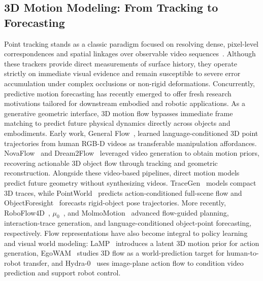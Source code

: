 \subsection{3D Motion Modeling: From Tracking to Forecasting}
Point tracking stands as a classic paradigm focused on resolving dense, pixel-level correspondences and spatial linkages over observable video sequences~\citep{lu2026track4world,karhade2026any4d,karaev23cotracker,Karaev_2025_ICCV,Xiao_2025_ICCV,tapip3d,luo20264rc}. Although these trackers provide direct measurements of surface history, they operate strictly on immediate visual evidence and remain susceptible to severe error accumulation under complex occlusions or non-rigid deformations. Concurrently, predictive motion forecasting has recently emerged to offer fresh research motivations tailored for downstream embodied and robotic applications. As a generative geometric interface, 3D motion flow bypasses immediate frame matching to predict future physical dynamics directly across objects and embodiments.
Early work, General Flow~\citep{yuan2024general}, learned
language-conditioned 3D point trajectories from human RGB-D videos
as transferable manipulation affordances.
NovaFlow~\citep{li2025novaflow} and
Dream2Flow~\citep{dharmarajan2025dream2flow} leveraged video generation
to obtain motion priors, recovering actionable 3D object flow
through tracking and geometric reconstruction.
Alongside these video-based pipelines, direct motion models
predict future geometry without synthesizing videos.
TraceGen~\citep{lee2026tracegen} models compact 3D traces,
while PointWorld~\citep{huang2026pointworld} predicts
action-conditioned full-scene flow and
ObjectForesight~\citep{soraki2026objectforesight} forecasts
rigid-object pose trajectories.
More recently, RoboFlow4D~\citep{lin2026roboflow4d},
$\mu_0$~\citep{lee2026mu_0}, and
MolmoMotion~\citep{zhang2026molmomotion} advanced
flow-guided planning, interaction-trace generation,
and language-conditioned object-point forecasting, respectively.
Flow representations have also become integral to policy
learning and visual world modeling:
LaMP~\citep{wang2026lamp} introduces a latent 3D motion prior
for action generation,
EgoWAM~\citep{li2026egowam} studies 3D flow as a world-prediction
target for human-to-robot transfer, and
Hydra-0~\citep{li2026hydra} uses image-plane action flow
to condition video prediction and support robot control.